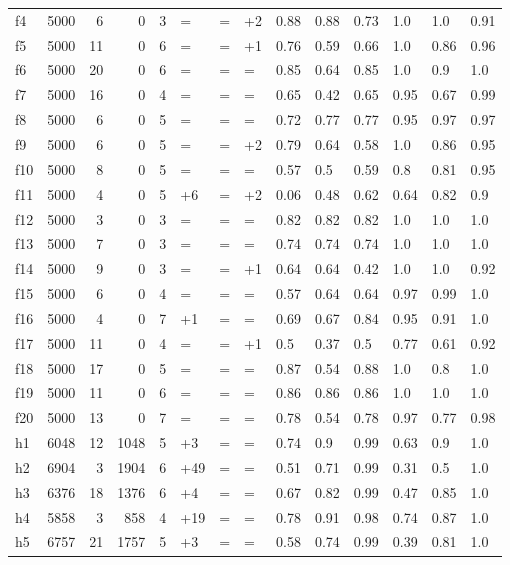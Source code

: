 \begin{tabular}{lrrrllllllllll}
f4 & 5000 & 6 & 0 & 3 & = & = & +2 & 0.88 & 0.88 & 0.73 & 1.0 & 1.0 & 0.91 \\
f5 & 5000 & 11 & 0 & 6 & = & = & +1 & 0.76 & 0.59 & 0.66 & 1.0 & 0.86 & 0.96 \\
f6 & 5000 & 20 & 0 & 6 & = & = & = & 0.85 & 0.64 & 0.85 & 1.0 & 0.9 & 1.0 \\
f7 & 5000 & 16 & 0 & 4 & = & = & = & 0.65 & 0.42 & 0.65 & 0.95 & 0.67 & 0.99 \\
f8 & 5000 & 6 & 0 & 5 & = & = & = & 0.72 & 0.77 & 0.77 & 0.95 & 0.97 & 0.97 \\
f9 & 5000 & 6 & 0 & 5 & = & = & +2 & 0.79 & 0.64 & 0.58 & 1.0 & 0.86 & 0.95 \\
f10 & 5000 & 8 & 0 & 5 & = & = & = & 0.57 & 0.5 & 0.59 & 0.8 & 0.81 & 0.95 \\
f11 & 5000 & 4 & 0 & 5 & +6 & = & +2 & 0.06 & 0.48 & 0.62 & 0.64 & 0.82 & 0.9 \\
f12 & 5000 & 3 & 0 & 3 & = & = & = & 0.82 & 0.82 & 0.82 & 1.0 & 1.0 & 1.0 \\
f13 & 5000 & 7 & 0 & 3 & = & = & = & 0.74 & 0.74 & 0.74 & 1.0 & 1.0 & 1.0 \\
f14 & 5000 & 9 & 0 & 3 & = & = & +1 & 0.64 & 0.64 & 0.42 & 1.0 & 1.0 & 0.92 \\
f15 & 5000 & 6 & 0 & 4 & = & = & = & 0.57 & 0.64 & 0.64 & 0.97 & 0.99 & 1.0 \\
f16 & 5000 & 4 & 0 & 7 & +1 & = & = & 0.69 & 0.67 & 0.84 & 0.95 & 0.91 & 1.0 \\
f17 & 5000 & 11 & 0 & 4 & = & = & +1 & 0.5 & 0.37 & 0.5 & 0.77 & 0.61 & 0.92 \\
f18 & 5000 & 17 & 0 & 5 & = & = & = & 0.87 & 0.54 & 0.88 & 1.0 & 0.8 & 1.0 \\
f19 & 5000 & 11 & 0 & 6 & = & = & = & 0.86 & 0.86 & 0.86 & 1.0 & 1.0 & 1.0 \\
f20 & 5000 & 13 & 0 & 7 & = & = & = & 0.78 & 0.54 & 0.78 & 0.97 & 0.77 & 0.98 \\
h1 & 6048 & 12 & 1048 & 5 & +3 & = & = & 0.74 & 0.9 & 0.99 & 0.63 & 0.9 & 1.0 \\
h2 & 6904 & 3 & 1904 & 6 & +49 & = & = & 0.51 & 0.71 & 0.99 & 0.31 & 0.5 & 1.0 \\
h3 & 6376 & 18 & 1376 & 6 & +4 & = & = & 0.67 & 0.82 & 0.99 & 0.47 & 0.85 & 1.0 \\
h4 & 5858 & 3 & 858 & 4 & +19 & = & = & 0.78 & 0.91 & 0.98 & 0.74 & 0.87 & 1.0 \\
h5 & 6757 & 21 & 1757 & 5 & +3 & = & = & 0.58 & 0.74 & 0.99 & 0.39 & 0.81 & 1.0 \\

\end{tabular}
